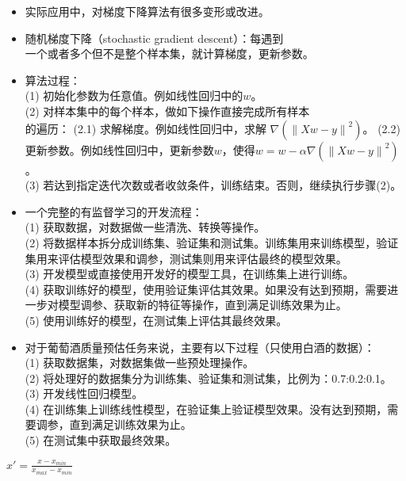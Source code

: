 \documentclass[10pt,a4paper]{ctexbook}
\begin{document}
\begin{itemize}
\item 实际应用中，对梯度下降算法有很多变形或改进。
\item 随机梯度下降（stochastic gradient descent）：每遇到
\\一个或者多个但不是整个样本集，就计算梯度，更新参数。
\item 算法过程：
\\(1) 初始化参数为任意值。例如线性回归中的$w$。
\\(2) 对样本集中的每个样本，做如下操作直接完成所有样本\\的遍历：
\subitem(2.1) 求解梯度。例如线性回归中，求解 $\nabla\left(\left\|{Xw-y}\right\|^{2}\right)$。
\subitem(2.2) 更新参数。例如线性回归中，更新参数$w$，使得$w=w-\alpha\nabla\left(\left\|{Xw-y}\right\|^{2}\right)$。
\\(3) 若达到指定迭代次数或者收敛条件，训练结束。否则，继续执行步骤(2)。
\end{itemize}

\begin{itemize}
\item 一个完整的有监督学习的开发流程：
\\(1) 获取数据，对数据做一些清洗、转换等操作。
\\(2) 将数据样本拆分成训练集、验证集和测试集。训练集用来训练模型，验证集用来评估模型效果和调参，测试集则用来评估最终的模型效果。
\\(3) 开发模型或直接使用开发好的模型工具，在训练集上进行训练。
\\(4) 获取训练好的模型，使用验证集评估其效果。如果没有达到预期，需要进一步对模型调参、获取新的特征等操作，直到满足训练效果为止。
\\(5) 使用训练好的模型，在测试集上评估其最终效果。

\item 对于葡萄酒质量预估任务来说，主要有以下过程（只使用白酒的数据）：
\\(1) 获取数据集，对数据集做一些预处理操作。
\\(2) 将处理好的数据集分为训练集、验证集和测试集，比例为：0.7:0.2:0.1。
\\(3) 开发线性回归模型。
\\(4) 在训练集上训练线性模型，在验证集上验证模型效果。没有达到预期，需要调参，直到满足训练效果为止。
\\(5) 在测试集中获取最终效果。

\end{itemize}

$x'={\frac {x - x_{min}}{x_{max} - x_{min}}}$
\end{document}
